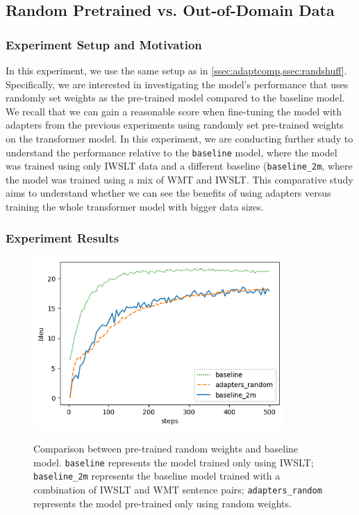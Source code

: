 \subsection{Random Pretrained vs. Out-of-Domain Data}
\label{ssec:randpre}
\subsubsection{Experiment Setup and Motivation}
In this experiment, we use the same setup as in \cref{ssec:adaptcomp,ssec:randshuff}. Specifically, we are interested in investigating the model's performance that uses randomly set weights as the pre-trained model compared to the baseline model. We recall that we can gain a reasonable score when fine-tuning the model with adapters from the previous experiments using randomly set pre-trained weights on the transformer model. In this experiment, we are conducting further study to understand the performance relative to the \texttt{baseline} model, where the model was trained using only IWSLT data and a different baseline (\texttt{baseline\_2m}, where the model was trained using a mix of WMT and IWSLT. This comparative study aims to understand whether we can see the benefits of using adapters versus training the whole transformer model with bigger data sizes.

\subsubsection{Experiment Results}

\begin{figure}[h]
    {\includegraphics[width=0.85\textwidth]{img/random.png}}
    \centering
    \caption[Comparison between pre-trained random weights and baseline model.]{Comparison between pre-trained random weights and baseline model. \texttt{baseline} represents the model trained only using IWSLT; \texttt{baseline\_2m} represents the baseline model trained with a combination of IWSLT and WMT sentence pairs; \texttt{adapters\_random} represents the model pre-trained only using random weights.}
    \label{img:rndbslcmp}
\end{figure}

